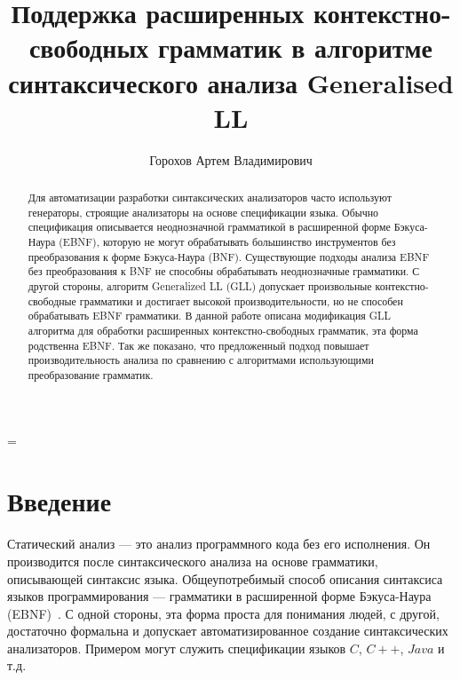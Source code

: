 \newtheorem{mydef}{Определение}
\emergencystretch=\maxdimen



\title{Поддержка расширенных контекстно-свободных грамматик 
	в алгоритме синтаксического анализа Generalised LL}


\author{Горохов Артем Владимирович}



\maketitle

\begin{abstract}
	Для автоматизации разработки синтаксических анализаторов часто используют генераторы, строящие анализаторы на основе спецификации языка.
	Обычно спецификация описывается неоднозначной грамматикой в расширенной форме Бэкуса-Наура (EBNF), которую не могут обрабатывать большинство инструментов без преобразования
	к форме Бэкуса-Наура (BNF).	Существующие подходы анализа EBNF без преобразования к BNF не способны обрабатывать неоднозначные грамматики. С другой стороны, алгоритм Generalized LL (GLL) допускает произвольные контекстно-свободные грамматики и достигает	высокой производительности, но не способен обрабатывать EBNF грамматики. 
	В данной работе описана модификация GLL алгоритма для обработки расширенных контекстно-свободных грамматик,
	эта форма родственна EBNF. Так же показано, что предложенный подход повышает производительность анализа по сравнению с алгоритмами использующими преобразование грамматик.
\end{abstract}


\section*{Введение}

Статический анализ --- это анализ программного кода без его исполнения. Он производится после синтаксического анализа на основе грамматики,
описывающей синтаксис языка.
Общеупотребимый способ описания синтаксиса языков программирования --- грамматики в расширенной форме Бэкуса-Наура (EBNF)~\cite{EBNFISO}.
С одной стороны, эта форма проста для понимания людей, с другой, достаточно формальна и допускает автоматизированное создание синтаксических анализаторов.
Примером могут служить спецификации языков $C$, $C++$, $Java$ и т.д. 

